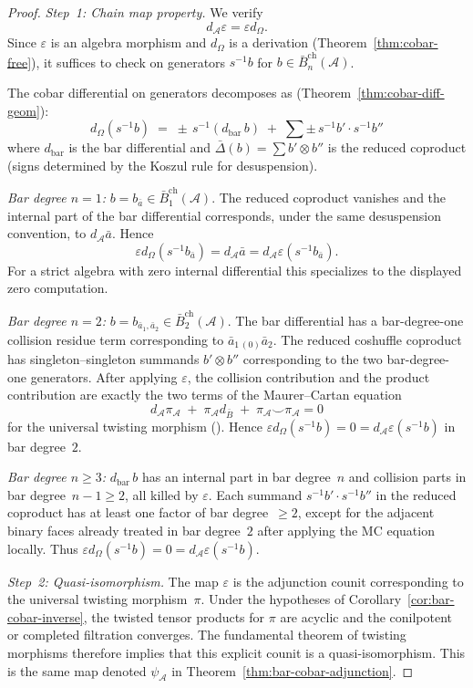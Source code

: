 \begin{proof}
\emph{Step~1: Chain map property.}
We verify
\[
d_{\mathcal A}\varepsilon=\varepsilon d_\Omega .
\]
Since $\varepsilon$ is an algebra morphism and $d_\Omega$ is a derivation
(Theorem~\ref{thm:cobar-free}), it suffices to check on generators
$s^{-1} b$ for $b \in \bar{B}^{\mathrm{ch}}_n(\mathcal{A})$.

The cobar differential on generators decomposes as
(Theorem~\ref{thm:cobar-diff-geom}):
\[
d_\Omega(s^{-1} b)
\;=\; \pm\, s^{-1}(d_{\mathrm{bar}}\, b)
\;+\; \sum \pm\, s^{-1} b' \cdot s^{-1} b''
\]
where $d_{\mathrm{bar}}$ is the bar differential and
$\bar{\Delta}(b) = \sum b' \otimes b''$ is the reduced coproduct
(signs determined by the Koszul rule for desuspension).

\emph{Bar degree $n=1$:}
$b = b_{\bar a} \in \bar{B}^{\mathrm{ch}}_1(\mathcal A)$.
The reduced coproduct vanishes and the internal part of the bar
differential corresponds, under the same desuspension convention, to
$d_{\mathcal A}\bar a$. Hence
\[
\varepsilon d_\Omega(s^{-1}b_{\bar a})
=d_{\mathcal A}\bar a
=d_{\mathcal A}\varepsilon(s^{-1}b_{\bar a}).
\]
For a strict algebra with zero internal differential this specializes
to the displayed zero computation.

\emph{Bar degree $n=2$:}
$b = b_{\bar a_1,\bar a_2} \in
\bar{B}^{\mathrm{ch}}_2(\mathcal A)$.
The bar differential has a bar-degree-one collision residue term
corresponding to $\bar a_{1\,(0)}\bar a_2$. The reduced coshuffle
coproduct has singleton--singleton summands
$b'\otimes b''$ corresponding to the two bar-degree-one generators.
After applying $\varepsilon$, the collision contribution and the
product contribution are exactly the two terms of the Maurer--Cartan
equation
\[
d_{\mathcal A}\pi_{\mathcal A}
\;+\;\pi_{\mathcal A}d_{\bar B}
\;+\;\pi_{\mathcal A}\smile\pi_{\mathcal A}=0
\]
for the universal twisting morphism
\textup{(}\cite[\S2.2, Proposition~2.2.6]{LV12}\textup{)}. Hence
$\varepsilon d_\Omega(s^{-1}b)=0=d_{\mathcal A}\varepsilon(s^{-1}b)$
in bar degree~$2$.

\emph{Bar degree $n \geq 3$:}
$d_{\mathrm{bar}}\, b$ has an internal part in bar degree~$n$ and
collision parts in bar degree~$n{-}1\geq2$, all killed by
$\varepsilon$. Each summand $s^{-1}b'\cdot s^{-1}b''$ in the reduced
coproduct has at least one factor of bar degree~$\geq2$, except for
the adjacent binary faces already treated in bar degree~$2$ after
applying the MC equation locally. Thus
$\varepsilon d_\Omega(s^{-1}b)=0=d_{\mathcal A}\varepsilon(s^{-1}b)$.

\emph{Step~2: Quasi-isomorphism.}
The map $\varepsilon$ is the adjunction counit corresponding to the
universal twisting morphism~$\pi$. Under the hypotheses of
Corollary~\ref{cor:bar-cobar-inverse}, the twisted tensor products for
$\pi$ are acyclic and the conilpotent or completed filtration
converges. The fundamental theorem of twisting morphisms therefore
implies that this explicit counit is a quasi-isomorphism. This is the
same map denoted $\psi_{\mathcal A}$ in
Theorem~\ref{thm:bar-cobar-adjunction}.
\end{proof}

